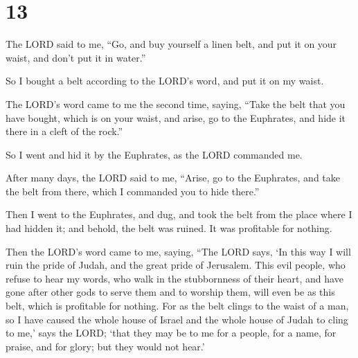 \hypertarget{section-12}{%
\section{13}\label{section-12}}

 The LORD said to me, ``Go, and buy yourself a linen belt,
and put it on your waist, and don't put it in water.''

 So I bought a belt according to the LORD's word, and put it
on my waist.

 The LORD's word came to me the second time, saying,
 ``Take the belt that you have bought, which is on your
waist, and arise, go to the Euphrates, and hide it there in a cleft of
the rock.''

 So I went and hid it by the Euphrates, as the LORD
commanded me.

 After many days, the LORD said to me, ``Arise, go to the
Euphrates, and take the belt from there, which I commanded you to hide
there.''

 Then I went to the Euphrates, and dug, and took the belt
from the place where I had hidden it; and behold, the belt was ruined.
It was profitable for nothing.

 Then the LORD's word came to me, saying,  ``The
LORD says, `In this way I will ruin the pride of Judah, and the great
pride of Jerusalem.  This evil people, who refuse to hear
my words, who walk in the stubbornness of their heart, and have gone
after other gods to serve them and to worship them, will even be as this
belt, which is profitable for nothing.  For as the belt
clings to the waist of a man, so I have caused the whole house of Israel
and the whole house of Judah to cling to me,' says the LORD; `that they
may be to me for a people, for a name, for praise, and for glory; but
they would not hear.'

